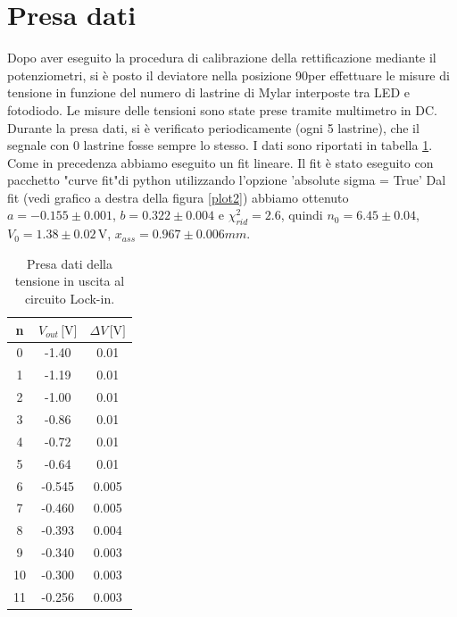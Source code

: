 \documentclass[10pt,a4paper]{article}
\begin{document}
\section{Presa dati}
Dopo aver eseguito la procedura di calibrazione della rettificazione mediante il potenziometri, si è posto il deviatore nella posizione 90\degree per effettuare le misure di tensione in funzione del numero di lastrine di Mylar interposte tra LED e fotodiodo.
Le misure delle tensioni sono state prese tramite multimetro in DC. Durante la presa dati, si è verificato periodicamente (ogni 5 lastrine), che il segnale con 0 lastrine fosse sempre lo stesso. I dati sono riportati in tabella \ref{tab:abs2}. Come in precedenza abbiamo eseguito un fit lineare. Il fit è stato eseguito con pacchetto "curve fit"di python utilizzando l'opzione 'absolute sigma = True'
Dal fit (vedi grafico a destra della figura \ref{plot2}) abbiamo ottenuto $a=-0.155\pm0.001$, $b=0.322\pm0.004$ e $\chi^2_{rid}=2.6$, quindi $n_0= 6.45\pm 0.04$, $V_0=1.38\pm0.02\,\mbox{V}$, $x_{ass}=0.967\pm0.006{mm}$.

\begin{table}
\centering
\begin{tabular}{|c|c|c|}
\hline
n	&	$V_{out}\,\mbox{[V]}$	&	$\Delta V\,\mbox{[V]}$\\
\hline
0  & -1.40 & 0.01\\
\hline
1   &-1.19  &0.01\\
\hline
2   &-1.00  &0.01\\
\hline
3   &-0.86  &0.01\\
\hline
4   &-0.72  &0.01\\
\hline
5   &-0.64  &0.01\\
\hline
6   &-0.545  &0.005\\
\hline
7   &-0.460  &0.005\\
\hline
8   &-0.393  &0.004\\
\hline
9   &-0.340  &0.003\\
\hline
10  &-0.300  &0.003\\
\hline
11  &-0.256  &0.003\\
\hline
\end{tabular}
\caption{Presa dati della tensione in uscita al circuito Lock-in.\label{tab:abs2}}
\end{table}
\end{document}
